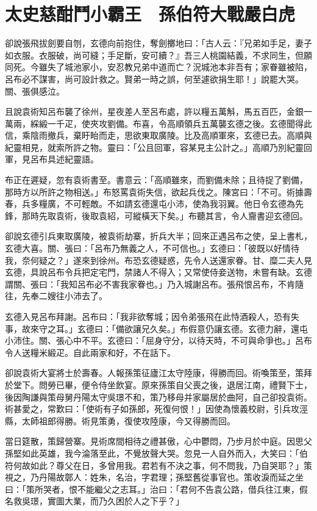 
\chapter{太史慈酣鬥小霸王　孫伯符大戰嚴白虎}

卻說張飛拔劍要自刎，玄德向前抱住，奪劍擲地曰：「古人云：『兄弟如手足，妻子如衣服。衣服破，尚可縫；手足斷，安可續？』吾三人桃園結義，不求同生，但願同死。今雖失了城池家小，安忍教兄弟中道而亡？況城池本非吾有；家眷雖被陷，呂布必不謀害，尚可設計救之。賢弟一時之誤，何至遽欲捐生耶！」說罷大哭。關、張俱感泣。

且說袁術知呂布襲了徐州，星夜差人至呂布處，許以糧五萬斛，馬五百匹，金銀一萬兩，綵緞一千疋，使夾攻劉備。布喜，令高順領兵五萬襲玄德之後。玄德聞得此信，乘陰雨撤兵，棄盱眙而走，思欲東取廣陵。比及高順軍來，玄德已去。高順與紀靈相見，就索所許之物。靈曰：「公且回軍，容某見主公計之。」高順乃別紀靈回軍，見呂布具述紀靈語。

布正在遲疑，忽有袁術書至。書意云：「高順雖來，而劉備未除；且待捉了劉備，那時方以所許之物相送。」布怒罵袁術失信，欲起兵伐之。陳宮曰：「不可。術據壽春，兵多糧廣，不可輕敵。不如請玄德還屯小沛，使為我羽翼。他日令玄德為先鋒，那時先取袁術，後取袁紹，可縱橫天下矣。」布聽其言，令人齎書迎玄德回。

卻說玄德引兵東取廣陵，被袁術劫寨，折兵大半；回來正遇呂布之使，呈上書札，玄德大喜。關、張曰：「呂布乃無義之人，不可信也。」玄德曰：「彼既以好情待我，奈何疑之？」遂來到徐州。布恐玄德疑惑，先令人送還家眷。甘、糜二夫人見玄德，具說呂布令兵把定宅門，禁諸人不得入；又常使侍妾送物，未嘗有缺。玄德謂關、張曰：「我知呂布必不害我家眷也。」乃入城謝呂布。張飛恨呂布，不肯隨往，先奉二嫂往小沛去了。

玄德入見呂布拜謝。呂布曰：「我非欲奪城；因令弟張飛在此恃酒殺人，恐有失事，故來守之耳。」玄德曰：「備欲讓兄久矣。」布假意仍讓玄德。玄德力辭，還屯小沛住。關、張心中不平。玄德曰：「屈身守分，以待天時，不可與命爭也。」呂布令人送糧米緞疋。自此兩家和好，不在話下。

卻說袁術大宴將士於壽春。人報孫策征廬江太守陸康，得勝而回。術喚策至，策拜於堂下。問勞已畢，便令侍坐飲宴。原來孫策自父喪之後，退居江南，禮賢下士，後因陶謙與策母舅丹陽太守吳璟不和，策乃移母并家屬居於曲阿，自己卻投袁術。術甚愛之，常歎曰：「使術有子如孫郎，死復何恨！」因使為懷義校尉，引兵攻涇縣，太師祖郎得勝。術見策勇，復使攻陸康，今又得勝而回。

當日筵散，策歸營寨。見術席間相待之禮甚傲，心中鬱悶，乃步月於中庭。因思父孫堅如此英雄，我今淪落至此，不覺放聲大哭。忽見一人自外而入，大笑曰：「伯符何故如此？尊父在日，多曾用我。君若有不決之事，何不問我，乃自哭耶？」策視之，乃丹陽故鄣人：姓朱，名治，字君理；孫堅舊從事官也。策收淚而延之坐曰：「策所哭者，恨不能繼父之志耳。」治曰：「君何不告袁公路，借兵往江東，假名救吳璟，實圖大業，而乃久困於人之下乎？」

